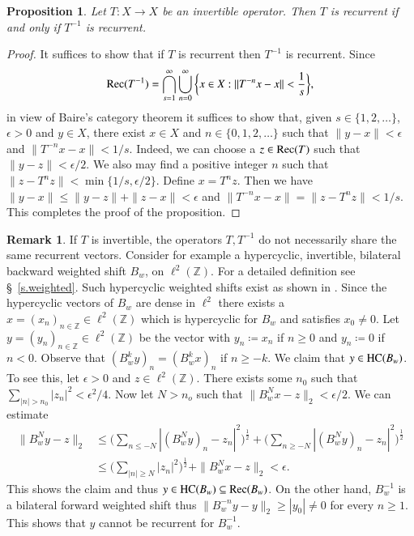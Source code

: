 \documentclass[12pt,leqno]{amsart}
\theoremstyle{plain}
\newtheorem{proposition}[equation]{Proposition}
\theoremstyle{definition}
\newtheorem{remark}[equation]{Remark}
\numberwithin{equation}{section}
\begin{document}
\begin{proposition}
	\label{p.invertible} Let $T:X\rightarrow X$ be an invertible operator. Then $T$ is recurrent if and only if $T^{-1}$ is recurrent. 
\end{proposition}

\begin{proof}
	It suffices to show that if $T$ is recurrent then $T^{-1}$ is recurrent. Since 
	\begin{align*}
		{\textnormal{Rec}}(T^{-1})=\bigcap_{s=1}^{\infty} \bigcup_{n=0}^{\infty} \bigg\{ x\in X: \| T^{-n}x-x\| <\frac{1}{s} \bigg\}, 
	\end{align*}
	in view of Baire's category theorem it suffices to show that, given $s\in \{ 1,2,\ldots \}$, $\epsilon >0$ and $y\in X$, there exist $x\in X$ and $n\in \{ 0,1,2,\ldots\}$ such that $\| y-x\| <\epsilon$ and $\| T^{-n}x-x\| <1/s$. Indeed, we can choose a $z\in {\textnormal{Rec}}(T)$ such that $\| y-z\| <\epsilon /2$. We also may find a positive integer $n$ such that $\| z-T^nz\| <\min \{1/s, \epsilon/2 \}$. Define $x=T^nz$. Then we have $\| y-x\| \leq \| y-z\| +\| z-x\| <\epsilon $ and 
	$\| T^{-n}x-x\| =\| z-T^n z\| <1/s$. This completes the proof of the proposition. 
\end{proof}

\begin{remark}
	If $T$ is invertible, the operators $T,T^{-1}$ do not necessarily share the same recurrent vectors. Consider for example a hypercyclic, invertible, bilateral backward weighted shift $B_w$, on $\ell^2(\mathbb Z)$. For a detailed definition see \S~\ref{s.weighted}. Such hypercyclic weighted shifts exist as shown in \cite{Salas}. Since the hypercyclic vectors of $B_w$ are dense in $\ell^2$ there exists a $x=(x_n)_{n\in\mathbb Z} \in\ell^2(\mathbb Z)$ which is hypercyclic for $B_w$ and satisfies $x_0\neq 0$. Let $y=(y_n)_{n\in\mathbb Z}\in\ell^2(\mathbb Z)$ be the vector with $y_n\coloneqq x_n$ if $n\geq 0$ and $y_n\coloneqq 0$ if $n<0$. Observe that $(B_w ^k y)_n=(B_w ^k x)_n$ if $n\geq -k$. We claim that $y\in{\textnormal{HC} }(B_w)$. To see this, let $\epsilon >0$ and $z\in\ell^2(\mathbb Z)$. There exists some $n_0$ such that $\sum_{|n|> n_0}|z_n|^2 <\epsilon^2/4$. Now let $N>n_o$ such that $\|B_w ^N x-z\|_2<\epsilon/2$. We can estimate
	\begin{align*}
		\|B^N _w y-z\|_2& \leq \bigg(\sum_{n\leq -N} |(B^N _wy)_n-z_n|^2\bigg)^\frac{1}{2}+\bigg(\sum_{n\geq - N} |(B^N _wy)_n-z_n|^2\bigg)^\frac{1}{2}
		\\
		&\leq  \bigg(\sum_{|n|\geq N} |z_n|^2\bigg)^\frac{1}{2}+\|B^N _w x-z\|_2<\epsilon.
	\end{align*}
This shows the claim and thus $y\in{\textnormal{HC} }(B_w)\subseteq {\textnormal{Rec}}(B_w)$. On the other hand, $B_w ^{-1}$ is a bilateral forward weighted shift thus $\|B_w ^{-n} y-y\|_2\geq |y_0|\neq 0 $ for every $n\geq 1$. This shows that $y$ cannot be recurrent for $B_w ^{-1}$.	
\end{remark}
\end{document}
